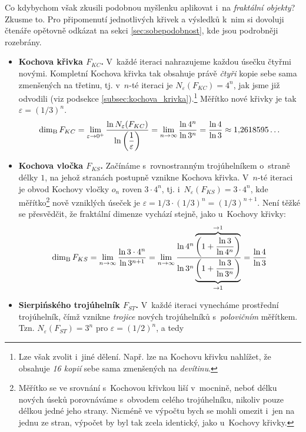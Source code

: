 Co kdybychom však zkusili podobnou myšlenku aplikovat i~na \emph{fraktální objekty}? Zkusme to. Pro připomenutí jednotlivých křivek a výsledků k~nim si dovoluji čtenáře opětovně odkázat na sekci \ref{sec:sobepodobnost}, kde jsou podrobněji rozebrány.
\begin{itemize}
    \item \textbf{Kochova křivka $F_{KC}$.} V~každé iteraci nahrazujeme každou úsečku čtyřmi novými. Kompletní Kochova křivka tak obsahuje právě \emph{čtyři} kopie sebe sama zmenšených na třetinu, tj. v~$n$-té iteraci je $N_\varepsilon(F_{KC})=4^n$, jak jsme již odvodili (viz podsekce \ref{subsec:kochova_krivka}).\footnote{Lze však zvolit i~jiné dělení. Např. lze na Kochovu křivku nahlížet, že obsahuje \emph{16 kopií} sebe sama zmenšených na \emph{devítinu}.} Měřítko nové křivky je tak $\varepsilon=(1/3)^n$.
    \begin{equation}\label{eq:kochova-krivka-dimenze}
        \operatorname{dim_B}{F_{KC}}=\lim_{\varepsilon\to 0^+}{\dfrac{\ln{N_\varepsilon(F_{KC})}}{\ln{\left(\dfrac{1}{\varepsilon}\right)}}}=\lim_{n\to\infty}{\dfrac{\ln{4^n}}{\ln{3^n}}}=\dfrac{\ln{4}}{\ln{3}}\approx 1{,}2618595\dots
    \end{equation}
    \item \textbf{Kochova vločka $F_{KS}$.} Začínáme s~rovnostranným trojúhelníkem o~straně délky $1$, na jehož stranách postupně vznikne Kochova křivka. V~$n$-té iteraci je obvod Kochovy vločky $o_n$ roven $3\cdot 4^n$, tj. i~$N_\varepsilon(F_{KS})=3\cdot 4^n$, kde měřítko\footnote{Měřítko se ve srovnání s~Kochovou křivkou liší v~mocnině, neboť délku nových úseků porovnáváme s~obvodem celého trojúhelníku, nikoliv pouze délkou jedné jeho strany. Nicméně ve výpočtu bych se mohli omezit i~jen na jednu ze stran, výpočet by byl tak zcela identický, jako u~Kochovy křivky.} nově vzniklých úseček je $\varepsilon=1/3\cdot(1/3)^n=(1/3)^{n+1}$. Není těžké se přesvědčit, že fraktální dimenze vychází stejně, jako u~Kochovy křivky:
    \begin{equation}\label{eq:kochova-vlocka-dimenze}
        \operatorname{dim_B}{F_{KS}}=\lim_{n\to\infty}{\dfrac{\ln{3\cdot 4^n}}{\ln{3^{n+1}}}}=\lim_{n\to\infty}{\dfrac{\ln{4^n}\overbrace{\left(1+\dfrac{\ln{3}}{\ln{4^n}}\right)}^{\to 1}}{\ln{3^n}\underbrace{\left(1+\dfrac{\ln{3}}{\ln{3^n}}\right)}_{\to 1}}}=\dfrac{\ln{4}}{\ln{3}}
    \end{equation}
    \item \textbf{Sierpińského trojúhelník $F_{ST}$.} V~každé iteraci vynecháme prostřední trojúhelník, čímž vznikne \emph{trojice} nových trojúhelníků s~\emph{polovičním} měřítkem. Tzn. $N_\varepsilon(F_{ST})=3^n$ pro $\varepsilon=(1/2)^n$, a tedy

\end{itemize}
